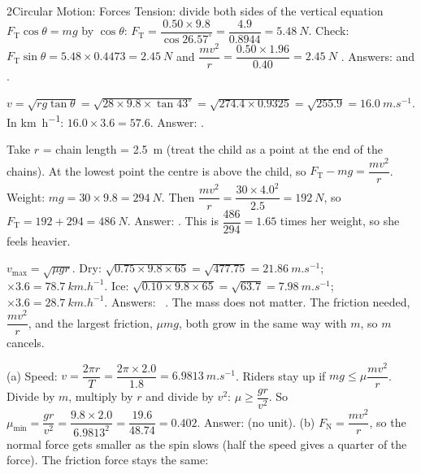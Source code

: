 \begin{chapteranswers}{2}{Circular Motion: Forces}
        Tension: divide both sides of the vertical equation $F_\mathrm{T}\cos\theta = mg$ by
        $\cos\theta$:
        $F_\mathrm{T} = \dfrac{0.50 \times 9.8}{\cos 26.57^\circ} = \dfrac{4.9}{0.8944} = \qty{5.48}{N}$.
        Check: $F_\mathrm{T}\sin\theta = 5.48 \times 0.4473 = \qty{2.45}{N}$ and
        $\dfrac{mv^2}{r} = \dfrac{0.50 \times 1.96}{0.40} = \qty{2.45}{N}$ \cmark.
        Answers:  and .
  \item $v = \sqrt{rg\tan\theta} = \sqrt{28 \times 9.8 \times \tan 43^\circ}
        = \sqrt{274.4 \times 0.9325} = \sqrt{255.9} = \qty{16.0}{m.s^{-1}}$.
        In \si{km.h^{-1}}: $16.0 \times 3.6 = 57.6$. Answer: .
  \item Take $r$ = chain length = \qty{2.5}{m} (treat the child as a point at the end of
        the chains). At the lowest point the centre is above the child, so
        $F_\mathrm{T} - mg = \dfrac{mv^2}{r}$. Weight: $mg = 30 \times 9.8 = \qty{294}{N}$.
        Then $\dfrac{mv^2}{r} = \dfrac{30 \times 4.0^2}{2.5} = \qty{192}{N}$, so
        $F_\mathrm{T} = 192 + 294 = \qty{486}{N}$.
        Answer: . This is $\dfrac{486}{294} = 1.65$ times
        her weight, so she feels heavier.
  \item $v_\mathrm{max} = \sqrt{\mu g r}$.
        Dry: $\sqrt{0.75 \times 9.8 \times 65} = \sqrt{477.75} = \qty{21.86}{m.s^{-1}}$;
        $\times 3.6 = \qty{78.7}{km.h^{-1}}$.
        Ice: $\sqrt{0.10 \times 9.8 \times 65} = \sqrt{63.7} = \qty{7.98}{m.s^{-1}}$;
        $\times 3.6 = \qty{28.7}{km.h^{-1}}$.
        Answers:  \ .
        The mass does not matter. The friction needed, $\dfrac{mv^2}{r}$, and the largest
        friction, $\mu mg$, both grow in the same way with $m$, so $m$ cancels.
  \item (a) Speed: $v = \dfrac{2\pi r}{T} = \dfrac{2\pi \times 2.0}{1.8} = \qty{6.9813}{m.s^{-1}}$.
        Riders stay up if $mg \le \mu\dfrac{mv^2}{r}$. Divide by $m$, multiply by $r$ and
        divide by $v^2$: $\mu \ge \dfrac{gr}{v^2}$. So
        $\mu_\mathrm{min} = \dfrac{gr}{v^2} = \dfrac{9.8 \times 2.0}{6.9813^2} = \dfrac{19.6}{48.74} = 0.402$.
        Answer:  (no unit).
        (b) $F_\mathrm{N} = \dfrac{mv^2}{r}$, so the normal force gets smaller as the spin slows
        (half the speed gives a quarter of the force). The friction force stays the same:

\end{chapteranswers}
